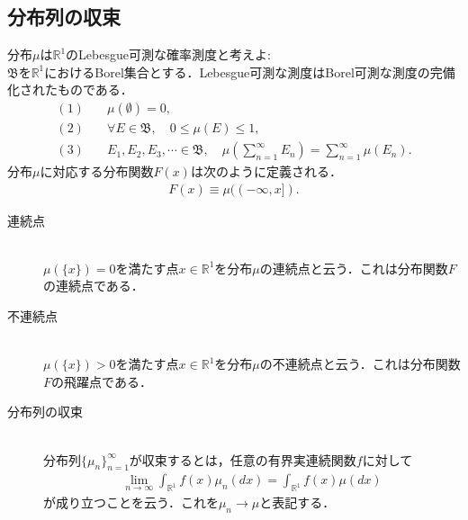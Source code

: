 \documentclass[a4j,papersize,disablejfam,slide,14pt]{jsarticle}
\begin{document}
\subsection{分布列の収束}
	分布$\mu$は$\mathbb{R}^1$の{\rm Lebesgue}可測な確率測度と考えよ:\\
    $\mathfrak{B}$を$\mathbb{R}^1$における{\rm Borel}集合とする．{\rm Lebesgue}可測な測度は{\rm Borel}可測な測度の完備化されたものである．
    \begin{align}
    	(1) &\quad \mu(\emptyset) = 0,\\
        (2) &\quad \forall E \in \mathfrak{B}, \quad 0 \leq \mu(E) \leq 1,\\
        (3) &\quad E_1,E_2,E_3,\cdots \in \mathfrak{B},\quad \mu\left(\sum_{n=1}^{\infty} E_n\right) = \sum_{n=1}^{\infty} \mu(E_n).
    \end{align}
    分布$\mu$に対応する分布関数$F(x)$は次のように定義される．
    \begin{align}
    	F(x) \equiv \mu((-\infty, x]).
    \end{align}
    \begin{screen}
    	\begin{description}
        	\item[連続点]\mbox{}\\
        		$\mu(\{x\}) = 0$を満たす点$x \in \mathbb{R}^1$を分布$\mu$の連続点と云う．これは分布関数$F$の連続点である．
            \item[不連続点]\mbox{}\\
            	$\mu(\{x\}) > 0$を満たす点$x \in \mathbb{R}^1$を分布$\mu$の不連続点と云う．これは分布関数$F$の飛躍点である．
        \end{description}
    \end{screen}
    \begin{screen}
    	\begin{description}
        	\item[分布列の収束]\mbox{}\\
            \label{def:convergence_distribution}
    			分布列$\{ \mu_n \}_{n=1}^{\infty}$が収束するとは，任意の有界実連続関数$f$に対して
    			\begin{align}
    				\lim_{n \to \infty} \int_{\mathbb{R}^1} f(x) \mu_n(dx) = \int_{\mathbb{R}^1} f(x) \mu(dx)
    			\end{align}
    			が成り立つことを云う．これを$\mu_n \to \mu$と表記する．
        \end{description}
    \end{screen}
    
\end{document}
